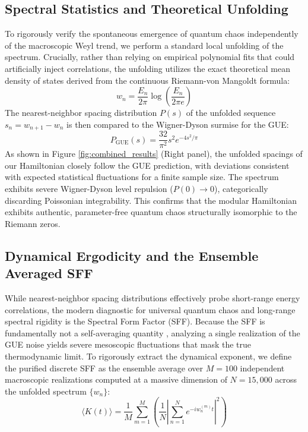 \documentclass[aps,prl,preprint,superscriptaddress,floatfix]{revtex4-2}
\begin{document}
\subsection{Spectral Statistics and Theoretical Unfolding}
To rigorously verify the spontaneous emergence of quantum chaos independently of the macroscopic Weyl trend, we perform a standard local unfolding of the spectrum. Crucially, rather than relying on empirical polynomial fits that could artificially inject correlations, the unfolding utilizes the exact theoretical mean density of states derived from the continuous Riemann-von Mangoldt formula:
\begin{equation}
w_n = \frac{E_n}{2\pi} \log\left(\frac{E_n}{2\pi e}\right)
\end{equation}
The nearest-neighbor spacing distribution $P(s)$ of the unfolded sequence $s_n = w_{n+1} - w_n$ is then compared to the Wigner-Dyson surmise for the GUE:
\begin{equation}
P_{\text{GUE}}(s) = \frac{32}{\pi^2} s^2 e^{-4s^2/\pi}
\end{equation}
As shown in Figure \ref{fig:combined_results} (Right panel), the unfolded spacings of our Hamiltonian closely follow the GUE prediction, with deviations consistent with expected statistical fluctuations for a finite sample size. The spectrum exhibits severe Wigner-Dyson level repulsion ($P(0) \to 0$), categorically discarding Poissonian integrability. This confirms that the modular Hamiltonian exhibits authentic, parameter-free quantum chaos structurally isomorphic to the Riemann zeros.

\subsection{Dynamical Ergodicity and the Ensemble Averaged SFF}

While nearest-neighbor spacing distributions effectively probe short-range energy correlations, the modern diagnostic for universal quantum chaos and long-range spectral rigidity is the Spectral Form Factor (SFF). Because the SFF is fundamentally not a self-averaging quantity \cite{Cotler2017, Saad2019}, analyzing a single realization of the GUE noise yields severe mesoscopic fluctuations that mask the true thermodynamic limit. To rigorously extract the dynamical exponent, we define the purified discrete SFF as the ensemble average over $M=100$ independent macroscopic realizations computed at a massive dimension of $N=15,000$ across the unfolded spectrum $\{w_n\}$:
\begin{equation}
\langle K(t) \rangle = \frac{1}{M} \sum_{m=1}^{M} \left( \frac{1}{N} \left| \sum_{n=1}^N e^{-i w_n^{(m)} t} \right|^2 \right)
\end{equation}
\end{document}
